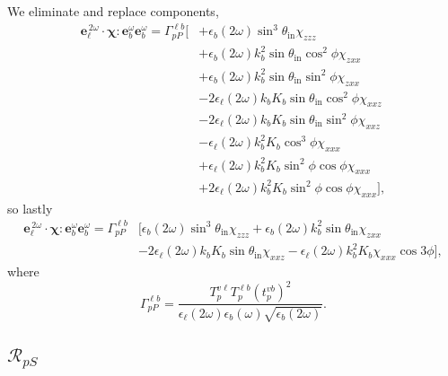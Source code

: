 We eliminate and replace components,
\begin{equation*}
\begin{split}
\mathbf{e}^{\,2\omega}_{\ell}\cdot
\boldsymbol{\chi}:\mathbf{e}^{\omega}_{b}\mathbf{e}^{\omega}_{b} = 
\Gamma^{\ell b}_{pP}
\bigg[
&+ \epsilon_{b}(2\omega)\sin^{3}\theta_{\mathrm{in}}\chi_{zzz}\\
&+ \epsilon_{b}(2\omega)k^{2}_{b}\sin\theta_{\mathrm{in}}\cos^{2}\phi\chi_{zxx}\\
&+ \epsilon_{b}(2\omega)k^{2}_{b}\sin\theta_{\mathrm{in}}\sin^{2}\phi\chi_{zxx}\\
&- 2\epsilon_{\ell}(2\omega)k_{b}K_{b}\sin\theta_{\mathrm{in}}\cos^{2}\phi\chi_{xxz}\\
&- 2\epsilon_{\ell}(2\omega)k_{b}K_{b}\sin\theta_{\mathrm{in}}\sin^{2}\phi\chi_{xxz}\\
&- \epsilon_{\ell}(2\omega)k^{2}_{b}K_{b}\cos^{3}\phi\chi_{xxx}\\
&+ \epsilon_{\ell}(2\omega)k^{2}_{b}K_{b}\sin^{2}\phi\cos\phi\chi_{xxx}\\
&+ 2\epsilon_{\ell}(2\omega)k^{2}_{b}K_{b}\sin^{2}\phi\cos\phi\chi_{xxx}
\bigg],
\end{split}
\end{equation*}
so lastly
\begin{equation*}
\begin{split}
\mathbf{e}^{\,2\omega}_{\ell}\cdot
\boldsymbol{\chi}:\mathbf{e}^{\omega}_{b}\mathbf{e}^{\omega}_{b} = 
\Gamma^{\ell b}_{pP}&
\bigg[
  \epsilon_{b}(2\omega)\sin^{3}\theta_{\mathrm{in}}\chi_{zzz}
+ \epsilon_{b}(2\omega)k^{2}_{b}\sin\theta_{\mathrm{in}}\chi_{zxx}\\
&- 2\epsilon_{\ell}(2\omega)k_{b}K_{b}\sin\theta_{\mathrm{in}}\chi_{xxz}
- \epsilon_{\ell}(2\omega)k^{2}_{b}K_{b}\chi_{xxx}\cos3\phi
\bigg],
\end{split}
\end{equation*}
where
\begin{equation*}
\Gamma^{\ell b}_{pP}=
\frac{T^{v\ell}_{p}T^{\ell b}_{p}\left(t^{vb}_{p}\right)^{2}}
  {\epsilon_{\ell}({2\omega})\epsilon_{b}(\omega)\sqrt{\epsilon_{b}(2\omega)}}.
\end{equation*}


\subsection{\texorpdfstring{$\mathcal{R}_{pS}$}{RpS}}

